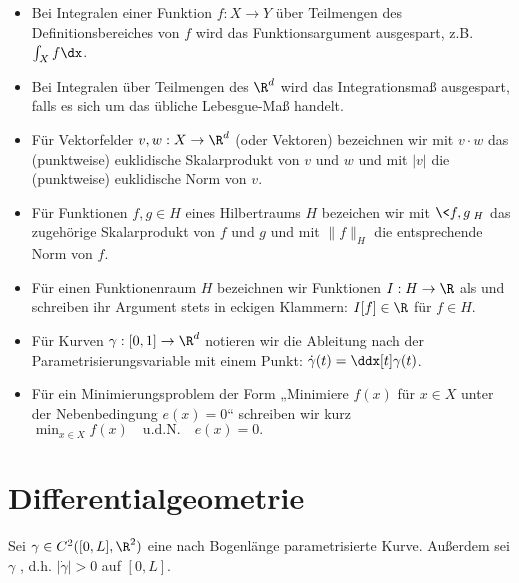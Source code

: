 \documentclass{mythesis}
\begin{document}
\begin{itemize}
    \item
	Bei Integralen einer Funktion $f: X \to Y$ über Teilmengen des Definitionsbereiches von $f$ wird das Funktionsargument ausgespart, z.B. $\int_X f \dx$.
    \item
	Bei Integralen über Teilmengen des $\R^d$ wird das Integrationsmaß ausgespart, falls es sich um das übliche Lebesgue-Maß handelt.
    \item
	Für Vektorfelder $v, w: X \to \R^d$ (oder Vektoren) bezeichnen wir mit $v \cdot w$ das (punktweise) euklidische Skalarprodukt von $v$ und $w$ und mit $|v|$ die (punktweise) euklidische Norm von $v$.
    \item
	Für Funktionen $f, g \in H$ eines Hilbertraums $H$ bezeichen wir mit $\<f, g\>_H$ das zugehörige Skalarprodukt von $f$ und $g$ und mit $\|f\|_H$ die entsprechende Norm von $f$.
    \item
	Für einen Funktionenraum $H$ bezeichnen wir Funktionen $I: H \to \R$ als  und schreiben ihr Argument stets in eckigen Klammern: $I[f] \in \R$ für $f \in H$.
    \item
	Für Kurven $\gamma: [0,1] \to \R^d$ notieren wir die Ableitung nach der Parametrisierungsvariable mit einem Punkt: $\dot \gamma(t) = \ddx[t] \gamma(t)$.
    \item
	Für ein Minimierungsproblem der Form „Minimiere $f(x)$ für $x \in X$ unter der Nebenbedingung $e(x) = 0$“ schreiben wir kurz
	\begin{math}
	    \min_{x\in X} f(x) \quad \mathrm{u.d.N.} \quad e(x) = 0.
	\end{math}
\end{itemize}


\section*{Differentialgeometrie}

Sei $\gamma \in C^2([0,L], \R^2)$ eine nach Bogenlänge parametrisierte Kurve.
Außerdem sei $\gamma$ , d.h. $|\dot\gamma| > 0$ auf $[0,L]$.
\end{document}
